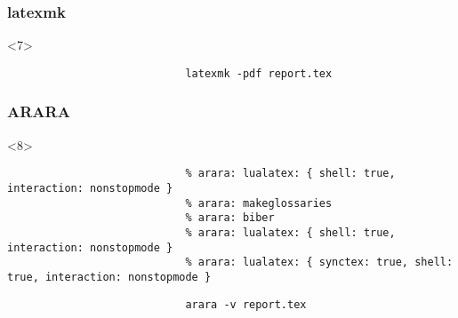 \documentclass{beamer}
\begin{document}
\begin{frame}[t,fragile]
\begin{onlyenv}
\begin{centering}
\begin{verbatim}
                        \end{verbatim}
                    \end{centering}
                \end{onlyenv}
                \frametitle<7>{latexmk}
                \begin{onlyenv}<7>
                    \begin{centering}
                        \begin{verbatim}
                            latexmk -pdf report.tex
                        \end{verbatim}
                    \end{centering}
                \end{onlyenv}
                \frametitle<8>{ARARA}
                \begin{onlyenv}<8>
                    \begin{centering}
                        \begin{verbatim}
                            % arara: lualatex: { shell: true, interaction: nonstopmode }
                            % arara: makeglossaries
                            % arara: biber
                            % arara: lualatex: { shell: true, interaction: nonstopmode }
                            % arara: lualatex: { synctex: true, shell: true, interaction: nonstopmode }
                        \end{verbatim}
                        \begin{verbatim}
                            arara -v report.tex
                        \end{verbatim}
                    \end{centering}
                \end{onlyenv}
        \end{frame}
\end{document}
